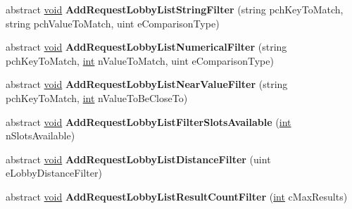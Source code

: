 \begin{DoxyCompactItemize}
\item 
\hypertarget{classValve_1_1Steamworks_1_1ISteamMatchmaking_a7c1bed67d911ea47b6d8b410b2e36f19}{}abstract \hyperlink{SDL__audio_8h_a52835ae37c4bb905b903cbaf5d04b05f}{void} {\bfseries Add\+Request\+Lobby\+List\+String\+Filter} (string pch\+Key\+To\+Match, string pch\+Value\+To\+Match, uint e\+Comparison\+Type)\label{classValve_1_1Steamworks_1_1ISteamMatchmaking_a7c1bed67d911ea47b6d8b410b2e36f19}

\item 
\hypertarget{classValve_1_1Steamworks_1_1ISteamMatchmaking_a81b89263ff569f73baaa372f137a8f07}{}abstract \hyperlink{SDL__audio_8h_a52835ae37c4bb905b903cbaf5d04b05f}{void} {\bfseries Add\+Request\+Lobby\+List\+Numerical\+Filter} (string pch\+Key\+To\+Match, \hyperlink{SDL__thread_8h_a6a64f9be4433e4de6e2f2f548cf3c08e}{int} n\+Value\+To\+Match, uint e\+Comparison\+Type)\label{classValve_1_1Steamworks_1_1ISteamMatchmaking_a81b89263ff569f73baaa372f137a8f07}

\item 
\hypertarget{classValve_1_1Steamworks_1_1ISteamMatchmaking_a81cf3e05b88731f20d3879586e98a29b}{}abstract \hyperlink{SDL__audio_8h_a52835ae37c4bb905b903cbaf5d04b05f}{void} {\bfseries Add\+Request\+Lobby\+List\+Near\+Value\+Filter} (string pch\+Key\+To\+Match, \hyperlink{SDL__thread_8h_a6a64f9be4433e4de6e2f2f548cf3c08e}{int} n\+Value\+To\+Be\+Close\+To)\label{classValve_1_1Steamworks_1_1ISteamMatchmaking_a81cf3e05b88731f20d3879586e98a29b}

\item 
\hypertarget{classValve_1_1Steamworks_1_1ISteamMatchmaking_a71378a53d362ea6d618d7cb090c1095d}{}abstract \hyperlink{SDL__audio_8h_a52835ae37c4bb905b903cbaf5d04b05f}{void} {\bfseries Add\+Request\+Lobby\+List\+Filter\+Slots\+Available} (\hyperlink{SDL__thread_8h_a6a64f9be4433e4de6e2f2f548cf3c08e}{int} n\+Slots\+Available)\label{classValve_1_1Steamworks_1_1ISteamMatchmaking_a71378a53d362ea6d618d7cb090c1095d}

\item 
\hypertarget{classValve_1_1Steamworks_1_1ISteamMatchmaking_a2891d8cd94f25ffa533b11753dec4008}{}abstract \hyperlink{SDL__audio_8h_a52835ae37c4bb905b903cbaf5d04b05f}{void} {\bfseries Add\+Request\+Lobby\+List\+Distance\+Filter} (uint e\+Lobby\+Distance\+Filter)\label{classValve_1_1Steamworks_1_1ISteamMatchmaking_a2891d8cd94f25ffa533b11753dec4008}

\item 
\hypertarget{classValve_1_1Steamworks_1_1ISteamMatchmaking_a12681ea090a46c171dca3479545b91a6}{}abstract \hyperlink{SDL__audio_8h_a52835ae37c4bb905b903cbaf5d04b05f}{void} {\bfseries Add\+Request\+Lobby\+List\+Result\+Count\+Filter} (\hyperlink{SDL__thread_8h_a6a64f9be4433e4de6e2f2f548cf3c08e}{int} c\+Max\+Results)\label{classValve_1_1Steamworks_1_1ISteamMatchmaking_a12681ea090a46c171dca3479545b91a6}


\end{DoxyCompactItemize}
